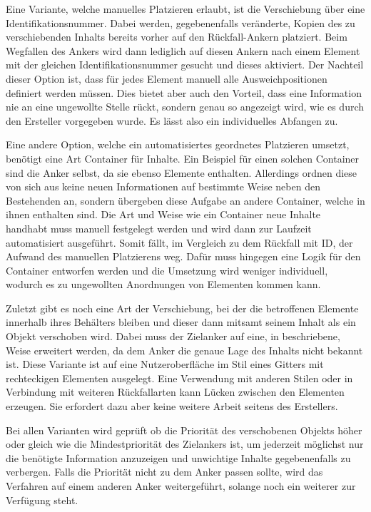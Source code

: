 			Eine Variante, welche manuelles Platzieren erlaubt, ist die Verschiebung über eine Identifikationsnummer. Dabei werden, gegebenenfalls veränderte, Kopien des zu verschiebenden Inhalts bereits vorher auf den Rückfall-Ankern platziert. Beim Wegfallen des Ankers wird dann lediglich auf diesen Ankern nach einem Element mit der gleichen Identifikationsnummer gesucht und dieses aktiviert. Der Nachteil dieser Option ist, dass für jedes Element manuell alle Ausweichpositionen definiert werden müssen. Dies bietet aber auch den Vorteil, dass eine Information nie an eine ungewollte Stelle rückt, sondern genau so angezeigt wird, wie es durch den Ersteller vorgegeben wurde. Es lässt also ein individuelles Abfangen zu.
			
			
			Eine andere Option, welche ein automatisiertes geordnetes Platzieren umsetzt, benötigt eine Art Container für Inhalte. Ein Beispiel für einen solchen Container sind die Anker selbst, da sie ebenso Elemente enthalten. Allerdings ordnen diese von sich aus keine neuen Informationen auf bestimmte Weise neben den Bestehenden an, sondern übergeben diese Aufgabe an andere Container, welche in ihnen enthalten sind. Die Art und Weise wie ein Container neue Inhalte handhabt muss manuell festgelegt werden und wird dann zur Laufzeit automatisiert ausgeführt. Somit fällt, im Vergleich zu dem Rückfall mit ID, der Aufwand des manuellen Platzierens weg. Dafür muss hingegen eine Logik für den Container entworfen werden und die Umsetzung wird weniger individuell, wodurch es zu ungewollten Anordnungen von Elementen kommen kann.
			
			
			Zuletzt gibt es noch eine Art der Verschiebung, bei der die betroffenen Elemente innerhalb ihres Behälters bleiben und dieser dann mitsamt seinem Inhalt als ein Objekt verschoben wird. Dabei muss der Zielanker auf eine, in  beschriebene, Weise erweitert werden, da dem Anker die genaue Lage des Inhalts nicht bekannt ist. Diese Variante ist auf eine Nutzeroberfläche im Stil eines Gitters mit rechteckigen Elementen ausgelegt. Eine Verwendung mit anderen Stilen oder in Verbindung mit weiteren Rückfallarten kann Lücken zwischen den Elementen erzeugen. Sie erfordert dazu aber keine weitere Arbeit seitens des Erstellers.
			
			
			Bei allen Varianten wird geprüft ob die Priorität des verschobenen Objekts höher oder gleich wie die Mindestpriorität des Zielankers ist, um jederzeit möglichst nur die benötigte Information anzuzeigen und unwichtige Inhalte gegebenenfalls zu verbergen. Falls die Priorität nicht zu dem Anker passen sollte, wird das Verfahren auf einem anderen Anker weitergeführt, solange noch ein weiterer zur Verfügung steht.
			
